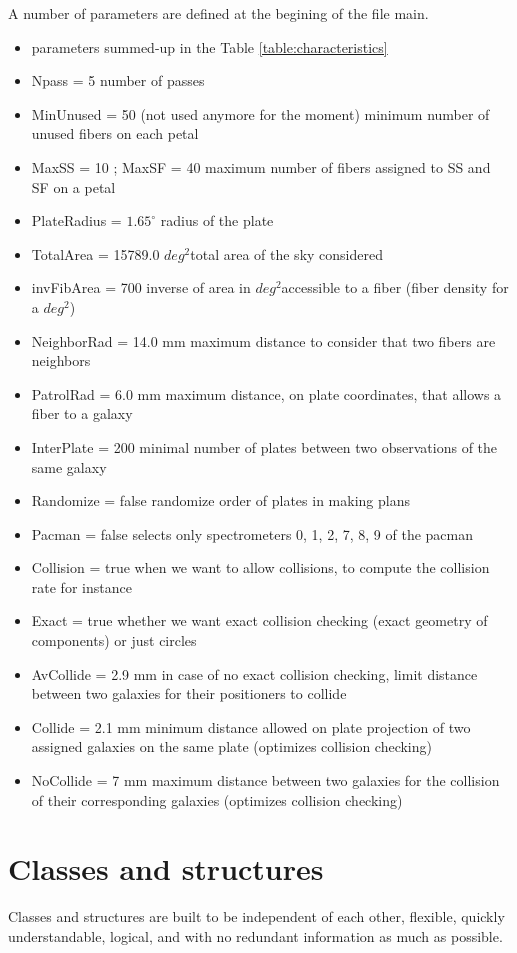 \documentclass{extarticle}
\def\sqd{$deg^{2}$}
\begin{document}
A number of parameters are defined at the begining of the file main.
\begin{itemize} 
	\item parameters summed-up in the Table \ref{table:characteristics}
	\item Npass = 5 number of passes
	\item MinUnused = 50 (not used anymore for the moment) minimum number of unused fibers on each petal
	\item MaxSS = 10 ; MaxSF = 40 maximum number of fibers assigned to SS and SF on a petal
	\item PlateRadius = $1.65^{\circ}$ radius of the plate
	\item TotalArea = 15789.0 \sqd total area of the sky considered
	\item invFibArea = 700 inverse of area in \sqd accessible to a fiber (fiber density for a \sqd)
	\item NeighborRad = 14.0 mm maximum distance to consider that two fibers are neighbors
	\item PatrolRad = 6.0 mm maximum distance, on plate coordinates, that allows a fiber to a galaxy
	\item InterPlate = 200 minimal number of plates between two observations of the same galaxy
	\item Randomize = false randomize order of plates in making plans
	\item Pacman = false selects only spectrometers 0, 1, 2, 7, 8, 9 of the pacman

	\item Collision = true when we want to allow collisions, to compute the collision rate for instance
	\item Exact = true whether we want exact collision checking (exact geometry of components) or just circles
	\item AvCollide = 2.9 mm in case of no exact collision checking, limit distance between two galaxies for their positioners to collide
	\item Collide = 2.1 mm minimum distance allowed on plate projection of two assigned galaxies on the same plate (optimizes collision checking)
	\item NoCollide = 7 mm maximum distance between two galaxies for the collision of their corresponding galaxies (optimizes collision checking)
\end{itemize} 


\section{Classes and structures}
Classes and structures are built to be independent of each other, flexible, quickly understandable, logical, and with no redundant information as much as possible.
\end{document}
